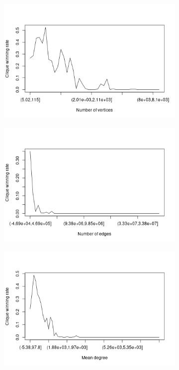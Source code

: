 \documentclass{l4proj}
\theoremstyle{definition}
\theoremstyle{remark}
\begin{document}
\begin{figure}
  \centering
  \begin{subfigure}[t]{0.49\textwidth}
    \centering
    \includegraphics[width=\textwidth]{images/vertices_bins.png}
  \end{subfigure}
  \begin{subfigure}[t]{0.49\textwidth}
    \centering
    \includegraphics[width=\textwidth]{images/edges_bins.png}
  \end{subfigure}
  \begin{subfigure}[t]{0.49\textwidth}
    \centering
    \includegraphics[width=\textwidth]{images/meandeg_bins.png}

\end{subfigure}
\end{figure}
\end{document}

